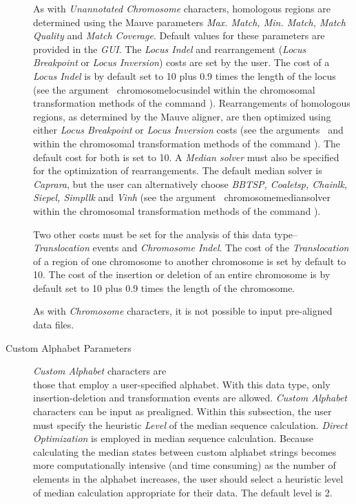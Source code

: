 \begin{description}
		\indent As with \emph{Unannotated Chromosome} characters, homologous regions are determined 
		using the Mauve parameters \emph{Max. Match, Min. Match, Match Quality} and 
		\emph {Match Coverage}. Default values for these parameters are provided in the \emph{GUI}.
		The \emph{Locus Indel} and rearrangement (\emph{Locus Breakpoint} or \emph{Locus Inversion}) 
		costs are set by the user. The cost of a \emph{Locus Indel} is by default set to 10 plus 0.9 times 
		the length of the locus (see the argument~ {chromosomelocusindel}  
		within the 	chromosomal transformation methods of the command ). 
		Rearrangements of homologous regions, as determined  by the Mauve aligner, are then 
		optimized using either \emph{Locus Breakpoint} or \emph{Locus Inversion} costs 
		(see the arguments~ 
		and~ within the chromosomal 
		transformation methods of the command ). 
		The default cost for both is set to 10. A \emph{Median solver} must also be specified for the 
		optimization of rearrangements. The default median solver is \emph{Caprara}, 
		but the user can alternatively choose \emph{BBTSP, Coaletsp, 
		Chainlk, Siepel, Simpllk} and \emph{Vinh} (see the argument~
		{chromosomemediansolver} within the chromosomal transformation methods of the command 
		).
		
		\indent Two other costs must be set for the analysis of this data type--\emph{Translocation} 
		events and \emph{Chromosome Indel}. The cost of the \emph{Translocation} of a region of one 
		chromosome to another chromosome is set by default to 10.  The cost of the insertion or deletion
		of an entire chromosome is by default set to 10 plus 0.9 times the length of the chromosome.
				
		As with \emph{Chromosome} characters, it is not possible to input pre-aligned data files. 
		
	\item [Custom Alphabet Parameters] \emph{Custom Alphabet} characters are \\those that employ
		a user-specified alphabet. With this data type, only insertion-deletion and transformation
		events are allowed. \emph{Custom Alphabet} characters can be input as prealigned. Within this 
		subsection, the user must specify the heuristic \emph{Level} of the median sequence calculation.
		\emph{Direct Optimization} is employed in median sequence calculation. Because calculating 
		the median states between custom alphabet strings becomes more computationally intensive (and time 
		consuming) as the number of elements in the alphabet increases, the user should select a heuristic 
		level of median calculation appropriate for their data.  The default level is 2.
		

\end{description}
